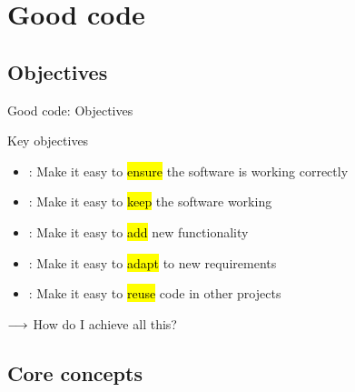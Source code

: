 \section{Good code}


\subsection{Objectives}


\begin{frame}{Good code: Objectives}
\begin{block}{Key objectives}{\relax}
	\begin{itemize}
		\item {}: Make it easy to \hl{ensure} the software is working correctly
		\item {}: Make it easy to \hl{keep} the software working 
		\item {}: Make it easy to \hl{add} new functionality
		\item {}: Make it easy to \hl{adapt} to new requirements
		\item {}: Make it easy to \hl{reuse} code in other projects
	\end{itemize}
\end{block}

\bigskip
{\Large $\longrightarrow$ How do I achieve all this?}

\end{frame}

\subsection{Core concepts}


